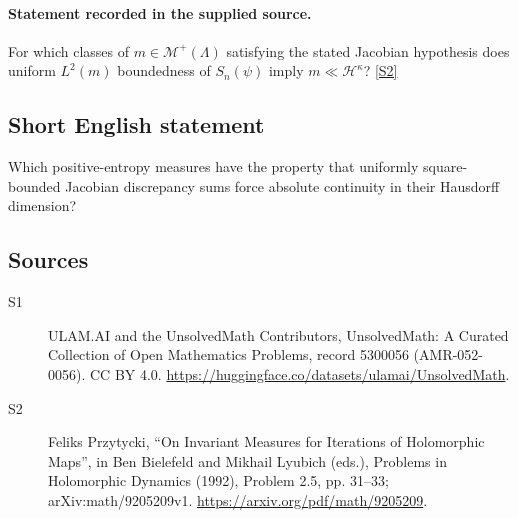 \documentclass[11pt]{article}
\newcommand{\sref}[2]{\hyperlink{source:#1:#2}{[S#2]}}
\begin{document}
\paragraph{Statement recorded in the supplied source.}
For which classes of $m\in\mathcal M^+(\Lambda)$ satisfying the stated Jacobian hypothesis does uniform $L^2(m)$ boundedness of $S_n(\psi)$ imply $m\ll\mathcal H^\kappa$? \sref{5300056}{2}
\subsection{Short English statement}
Which positive-entropy measures have the property that uniformly square-bounded Jacobian discrepancy sums force absolute continuity in their Hausdorff dimension?
\subsection{Sources}
\begin{description}
\item[\hypertarget{source:5300056:1}{S1}] ULAM.AI and the UnsolvedMath Contributors, UnsolvedMath: A Curated Collection of Open Mathematics Problems, record 5300056 (AMR-052-0056). CC BY 4.0. \url{https://huggingface.co/datasets/ulamai/UnsolvedMath}.
\item[\hypertarget{source:5300056:2}{S2}] Feliks Przytycki, ``On Invariant Measures for Iterations of Holomorphic Maps'', in Ben Bielefeld and Mikhail Lyubich (eds.), Problems in Holomorphic Dynamics (1992), Problem 2.5, pp. 31--33; arXiv:math/9205209v1. \url{https://arxiv.org/pdf/math/9205209}.
\end{description}
\label{end:5300056}
\end{document}
